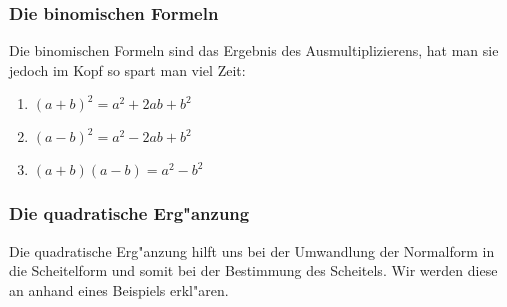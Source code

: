 \subsubsection{Die binomischen Formeln}
Die binomischen Formeln sind das Ergebnis des Ausmultiplizierens, hat man sie jedoch im Kopf so spart man viel Zeit:
\begin{enumerate}
\item $(a+b)^2=a^2+2ab+b^2$
\item $(a-b)^2=a^2-2ab+b^2$
\item $(a+b)(a-b)=a^2-b^2$
\end{enumerate}

\subsubsection{Die quadratische Erg"anzung}
Die quadratische Erg"anzung hilft uns bei der Umwandlung der Normalform in die Scheitelform und somit bei der Bestimmung des Scheitels. Wir werden diese an anhand eines Beispiels erkl"aren.

